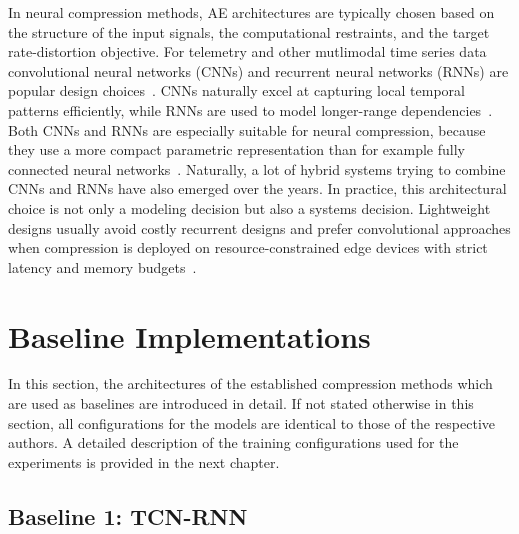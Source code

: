 In neural compression methods, AE architectures are typically chosen based on the structure of the input signals, the computational restraints, and the target rate-distortion objective. For telemetry and other mutlimodal time series data convolutional neural networks (CNNs) and recurrent neural networks (RNNs) are popular design choices~\cite[pp.146--148]{Yang2022}. CNNs naturally excel at capturing local temporal patterns efficiently, while RNNs are used to model longer-range dependencies~\cite[pp.146--148]{Yang2022}. Both CNNs and RNNs are especially suitable for neural compression, because they use a more compact parametric representation than for example fully connected neural networks~\cite{Du2019}. Naturally, a lot of hybrid systems trying to combine CNNs and RNNs have also emerged over the years. In practice, this architectural choice is not only a modeling decision but also a systems decision. Lightweight designs usually avoid costly recurrent designs and prefer convolutional approaches when compression is deployed on resource-constrained edge devices with strict latency and memory budgets~\cite{Hodo2025, Johnston2019}. 

\section{Baseline Implementations}

In this section, the architectures of the established compression methods which are used as baselines are introduced in detail. If not stated otherwise in this section, all configurations for the models are identical to those of the respective authors. A detailed description of the training configurations used for the experiments is provided in the next chapter.

\subsection{Baseline 1: TCN-RNN}

